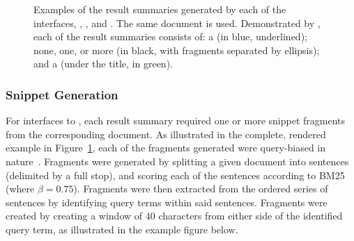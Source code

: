 \begin{figure}[t!]
    \centering
    \caption[Examples of result summaries across experimental interfaces]{Examples of the result summaries generated by each of the interfaces, , ,  and . The same document is used. Demonstrated by \searchlogo, each of the result summaries consists of: a  (in blue, underlined); none, one, or more  (in black, with fragments separated by ellipsis); and a  (under the title, in green).}
    \label{fig:interface_snippets}
\end{figure}

\subsubsection{Snippet Generation}\label{sec:snippets:method:snippets}
For interfaces  to , each result summary required one or more snippet fragments from the corresponding document. As illustrated in the complete, rendered example in Figure~\ref{fig:interface_snippets}, each of the fragments generated were query-biased in nature~\citep{tombros1998query_biased}. Fragments were generated by splitting a given document into sentences (delimited by a full stop), and scoring each of the sentences according to BM25 (where $\beta=0.75$). Fragments were then extracted from the ordered series of sentences by identifying query terms within said sentences. Fragments were created by creating a window of $40$ characters from either side of the identified query term, as illustrated in the example figure below.

\begin{figure}[h]
    \centering
    \vspace{4mm}
    \label{fig:fragment_example}
    \vspace{-5mm}
\end{figure}


